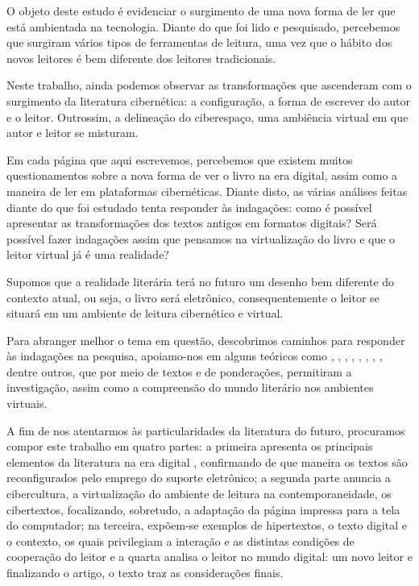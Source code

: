 \begin{refsection}
    O objeto deste estudo é evidenciar o surgimento de uma nova forma de ler que está ambientada na tecnologia. Diante do que foi lido e pesquisado, percebemos que surgiram vários tipos de ferramentas de leitura, uma vez que o hábito dos novos leitores é bem diferente dos leitores tradicionais. 

    Neste trabalho, ainda podemos observar as transformações que ascenderam com o surgimento da literatura cibernética: a configuração, a forma de escrever do autor e o leitor. Outrossim, a delineação do ciberespaço, uma ambiência virtual em que autor e leitor se misturam. 

    Em cada página que aqui escrevemos, percebemos que existem muitos questionamentos sobre a nova forma de ver o livro na era digital, assim como a maneira de ler em plataformas cibernéticas. Diante disto, as várias análises feitas diante do que foi estudado tenta responder às indagações: como é possível apresentar as transformações dos textos antigos em formatos digitais? Será possível fazer indagações assim que pensamos na virtualização do livro e que o leitor virtual já é uma realidade? 

    Supomos que a realidade literária terá no futuro um desenho bem diferente do contexto atual, ou seja, o livro será eletrônico, consequentemente o leitor se situará em um ambiente de leitura cibernético e virtual. 

    Para abranger melhor o tema em questão, descobrimos caminhos para responder às indagações na pesquisa, apoiamo-nos em alguns teóricos como \textcite{Ong1996Oralidad}, \textcite{Marcuschi2001Hipertexto}, \textcite{Santaella2004Navegar}, \textcite{Gomes2009Nativos}, \textcite{Levy1996Virtual, Levy1999Cibercultura}, \textcite{Ramos2015Fazer}, \textcite{Xavier2009Era}, \textcite{PalfreyAndGasser2011Nascidos}, dentre outros, que por meio de textos e de ponderações, permitiram a investigação, assim como a compreensão do mundo literário nos ambientes virtuais.   

    A fim de nos atentarmos às particularidades da literatura do futuro, procuramos compor este trabalho em quatro partes: a primeira apresenta os principais elementos da literatura na era digital , confirmando de que maneira os textos são reconfigurados pelo emprego do suporte eletrônico; a segunda parte anuncia a cibercultura, a virtualização do ambiente de leitura na contemporaneidade, os cibertextos, focalizando, sobretudo, a adaptação da página impressa para a tela do computador; na terceira, expõem-se exemplos de hipertextos, o texto digital e o contexto, os quais privilegiam a interação e as distintas condições de cooperação do leitor e a quarta analisa o leitor no mundo digital: um novo leitor e finalizando o artigo, o texto traz as considerações finais.


\end{refsection}
